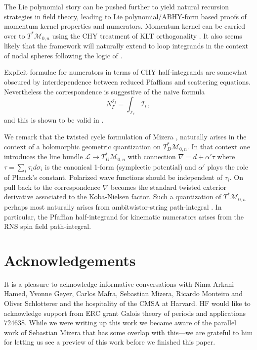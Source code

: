 \documentclass[11pt]{article}
\newcommand{\cI}{\mathcal{I}}
\newcommand{\cL}{\mathcal{L}}
\newcommand{\cM}{\mathcal{M}}
\newcommand{\1}{{\rm 1\hskip-0.25em I}}
\begin{document}
The Lie polynomial story can be pushed further to yield natural recursion strategies in field theory, leading to Lie polynomial/ABHY-form based proofs of momentum kernel properties and numerators.  Momentum kernel can be carried over to $T^*\cM_{0,n}$ using the CHY treatment of KLT orthogonality \cite{Cachazo:2013gna}.  It also seems likely that the framework will naturally extend to loop integrands in the context of nodal spheres following the logic of \cite{Geyer:2015bja}. 


 Explicit formulae for numerators  in terms of CHY half-integrands are somewhat  obscured by interdependence between reduced Pfaffians and scattering equations.  Nevertheless the  correspondence is suggestive of the
 naive formula
\begin{equation}
N^{\cI_l}_\Gamma=\int_{T_\Gamma}\cI_l\, ,
\end{equation}
and this is shown to be valid in \cite{Mizera:2019n}. 

We remark that the twisted cycle formulation of Mizera \cite{Mizera:2019gea}, naturally arises in the context of a holomorphic  geometric quantization on $T^*_D\cM_{0,n}$.  In that context one introduces the line bundle $\cL\rightarrow T^*_D\cM_{0,n}$ with connection $\nabla=d+ \alpha'\tau $  where $\tau=\sum_i \tau_i d\sigma_i$ is the canonical 1-form (symplectic potential) and $\alpha'$ plays the role of Planck's constant. Polarized wave functions should be independent of $\tau_i$.  On pull back to the correspondence $\nabla $ becomes the standard twisted exterior derivative associated to the Koba-Nielsen factor. 
Such a 
quantization of $T^*\cM_{0,n}$ perhaps most naturally arises from ambitwistor-string path-integral \cite{Mason:2013sva}. In particular, the Pfaffian half-integrand for kinematic numerators arises from the RNS spin field path-integral.


\section{Acknowledgements}
It is a pleasure to acknowledge informative conversations with Nima Arkani-Hamed, Yvonne Geyer, Carlos Mafra, Sebastian Mizera, Ricardo Monteiro and Oliver Schlotterer and the hospitality of the CMSA at Harvard. HF would like to acknowledge support from ERC grant Galois theory of periods and applications 724638.  While we were writing up this work we became aware of the parallel work of Sebastian Mizera \cite{Mizera:2019n} that has some overlap with this---we are grateful to him for letting us see a preview of this work before we finished this paper.

  

\end{document}
